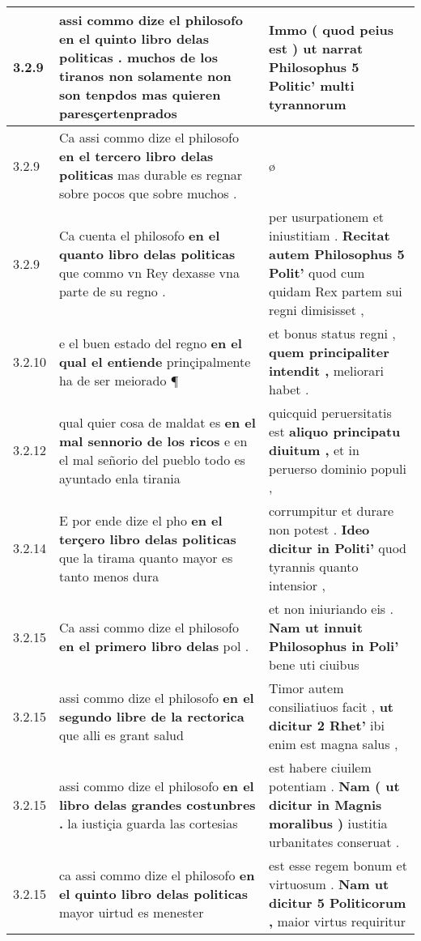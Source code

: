 \begin{tabular}{|p{1cm}|p{6.5cm}|p{6.5cm}|}
3.2.9 & assi commo dize el philosofo \textbf{ en el quinto libro delas politicas . } muchos de los tiranos non solamente non son tenpdos mas quieren paresçertenprados & Immo ( quod peius est ) \textbf{ ut narrat Philosophus 5 Politic’ } multi tyrannorum \\\hline
3.2.9 & Ca assi commo dize el philosofo \textbf{ en el tercero libro delas politicas } mas durable es regnar sobre pocos que sobre muchos . & ø \\\hline
3.2.9 & Ca cuenta el philosofo \textbf{ en el quanto libro delas politicas } que commo vn Rey dexasse vna parte de su regno . & per usurpationem et iniustitiam . \textbf{ Recitat autem Philosophus 5 Polit’ } quod cum quidam Rex partem sui regni dimisisset , \\\hline
3.2.10 & e el buen estado del regno \textbf{ en el qual el entiende } prinçipalmente ha de ser meiorado ¶ & et bonus status regni , \textbf{ quem principaliter intendit , } meliorari habet . \\\hline
3.2.12 & qual quier cosa de maldat es \textbf{ en el mal sennorio de los ricos } e en el mal señorio del pueblo todo es ayuntado enla tirania & quicquid peruersitatis est \textbf{ aliquo principatu diuitum , } et in peruerso dominio populi , \\\hline
3.2.14 & E por ende dize el pho \textbf{ en el terçero libro delas politicas } que la tirama quanto mayor es tanto menos dura & corrumpitur et durare non potest . \textbf{ Ideo dicitur in Politi’ } quod tyrannis quanto intensior , \\\hline
3.2.15 & Ca assi commo dize el philosofo \textbf{ en el primero libro delas } pol . & et non iniuriando eis . \textbf{ Nam ut innuit Philosophus in Poli’ } bene uti ciuibus \\\hline
3.2.15 & assi commo dize el philosofo \textbf{ en el segundo libre de la rectorica } que alli es grant salud & Timor autem consiliatiuos facit , \textbf{ ut dicitur 2 Rhet’ } ibi enim est magna salus , \\\hline
3.2.15 & assi commo dize el philosofo \textbf{ en el libro delas grandes costunbres . } la iustiçia guarda las cortesias & est habere ciuilem potentiam . \textbf{ Nam ( ut dicitur in Magnis moralibus ) } iustitia urbanitates conseruat . \\\hline
3.2.15 & ca assi commo dize el philosofo \textbf{ en el quinto libro delas politicas } mayor uirtud es menester & est esse regem bonum et virtuosum . \textbf{ Nam ut dicitur 5 Politicorum , } maior virtus requiritur \\\hline

\end{tabular}
